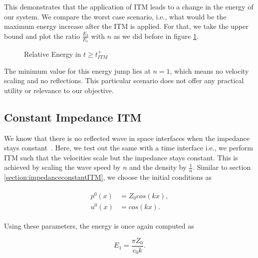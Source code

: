 This demonstrates that the application of \ac{ITM} leads to a change in the energy of our system. We compare the worst case scenario, i.e., what would be the maximum energy increase after the ITM is applied. For that,
 we take the upper bound and plot the ratio $\frac{E_3}{E_1}$ with $n$ as we did before in figure \ref{fig:ratio2}.

\begin{figure}
    \centering
    \caption{Relative Energy in $t \geq t_{ITM}^+$}
    \label{fig:ratio2}
\end{figure}

The minimum value for this energy jump lies at $n=1$, which means no velocity scaling and no reflections. This particular scenario does not offer any practical utility
or relevance to our objective.

\subsection{Constant Impedance \ac{ITM}}
We know that there is no reflected wave in space interfaces when the impedance stays constant~\parencite[Sec 9.7]{leveque_2002}. Here, we test out the same with a time interface i.e., we perform \ac{ITM} such that the velocities scale but the impedance stays constant. This is achieved by scaling the wave speed by $n$ and the density by $\frac{1}{n}$.
Similar to section \ref{section:impedanceconstantITM}, we choose the initial conditions as

\begin{align}
    \begin{split}
        p^0\left(x\right) &= Z_0cos\left(kx\right), \\
        u^0\left(x\right) &= cos\left(kx\right) .
    \end{split}
    \label{eq:initialconditions2}
\end{align}

Using these parameters, the energy is once again computed as

\begin{equation}
    E_1 = \frac{\pi Z_0}{c_0 k} .
\end{equation}

